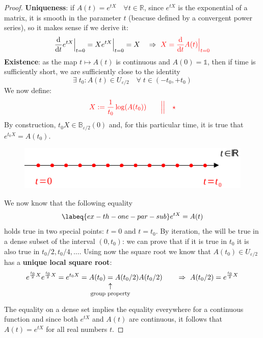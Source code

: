 \documentclass[../main.tex]{subfiles}
\begin{document}
\begin{proof}
 \textbf{Uniqueness}: if $A(t)=e^{tX} \quad \forall t\in\mathbb{R}$, since $e^{tX}$ is the exponential of a matrix, it is smooth in the parameter $t$ (beacuse defined by a convergent power series), so it makes sense if we derive it:
\[
\dv{}{t}e^{tX}\Bigr|_{\substack{t=0}}=Xe^{tX}\Bigr|_{\substack{t=0}}=X\quad \Rightarrow\ {\color{red}X=\dv{}{t}A(t)\Bigr|_{\substack{t=0}}}
\]
 \textbf{Existence}: as the map $t\mapsto A(t)$ is continuous and $A(0)=\mathbb{1}$, then if time is sufficiently short, we are sufficiently close to the identity
\[
\exists\; t_0:A(t)\in U_{\varepsilon/2}\quad\forall\; t\in(-t_0,+t_0)
\]
We now define:
\[
{\color{red}X:=\frac{1}{t_0}\log(A(t_0))\qquad \Big|\Big|\quad \star}
\]
By construction, $t_0X\in\mathbb{B}_{\varepsilon/2}(0)$ and, for this particular time, it is true that $e^{t_0X}=A(t_0)$.
\begin{figure}[H]
    \includegraphics[width=1\textwidth]{images/ex-th-one-par-sub.pdf}
    \caption*{}
\end{figure}
We now  know that the following equality
\begin{equation}\labeq{ex-th-one-par-sub}
e^{tX}=A(t)
\end{equation}
holds true in two special points: $t=0$ and $t=t_0$. By iteration, the  will be true in a dense subset of the interval $(0,t_0)$: we can prove that if it is true in $t_0$ it is also true in $t_0/2, t_0/4,\dots$. Using now the square root  we know that $A(t_0)\in U_{\varepsilon/2}$ has a \textbf{unique local square root}:
\[
e^{\frac{t_0}{2}X}e^{\frac{t_0}{2}X}=e^{t_0X}=A(t_0)\underset{\mathclap{\tikz \node {$\uparrow$} node [below=1ex] {\footnotesize group property };}}=A(t_0/2)A(t_0/2)\qquad\Rightarrow\  A(t_0/2)=e^{\frac{t_0}{2}X}
\]
The equality on a dense set implies the equality everywhere for a continuous function and since both $e^{tX}$ and $A(t)$ are continuous, it follows that $A(t)=e^{tX}$ for all real numbers $t$. 
\end{proof}
\end{document}
